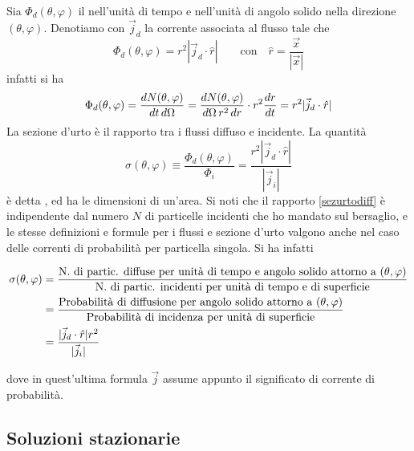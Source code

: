\documentclass[../../FisicaTeorica.tex]{subfiles}
\begin{document}
Sia $\Phi_d (\theta, \varphi)$ il 
nell'unit{\`a} di tempo e nell'unit{\`a} di angolo solido nella direzione
$(\theta, \varphi)$. Denotiamo con $\vec{j}_d$ la corrente associata al flusso
tale che
\[ \Phi_d (\theta, \varphi) = r^2  | \vec{j}_d \cdot \hat{r} | \qquad
   \text{con} \quad \hat{r} = \frac{\vec{x}}{| \vec{x} |} \]
infatti si ha
\[ \Phi_d (\theta, \varphi) = \frac{d N (\theta, \varphi)}{d t \hspace{0.17em}
   d \Omega} = \frac{d N (\theta, \varphi)}{d \Omega \hspace{0.17em} r^2 
   \hspace{0.17em} d r} \cdot r^2  \frac{d r}{d t} = r^2  | \vec{j}_d \cdot
   \hat{r} | \]
La sezione d'urto {\`e} il rapporto tra i flussi diffuso e incidente. La
quantit{\`a}
\begin{equation}
\label{sezurtodiff} \sigma (\theta, \varphi) \equiv \frac{\Phi_d (\theta,
   \varphi)}{\Phi_i} = \frac{r^2  | \vec{j}_d \cdot \hat{r} |}{| \vec{j}_i |}
\end{equation}
{\`e} detta {}, ed ha le dimensioni di
un'area. Si noti che  il rapporto \eqref{sezurtodiff} {\`e} indipendente dal numero $N$ di
particelle incidenti che ho mandato sul bersaglio, e le stesse definizioni e
formule per i flussi e sezione d'urto valgono anche nel caso delle correnti di
probabilit{\`a} per particella singola. Si ha infatti

\begin{align}
  \sigma (\theta, \varphi) & = \frac{\text{N. di partic. diffuse per unit{\`a}
  di tempo e angolo solido attorno a } (\theta, \varphi)}{\text{N. di partic.
  incidenti per unit{\`a} di tempo e di superficie}} \notag \\
  & = \frac{\text{Probabilit{\`a} di diffusione per angolo solido attorno a }
  (\theta, \varphi)}{\text{Probabilit{\`a} di incidenza per unit{\`a} di
  superficie}} \notag\\
  & = \frac{| \vec{j}_d \cdot \hat{r} | r^2}{| \vec{j}_i |} \label{sezurtodiff2}
\end{align}

dove in quest'ultima formula $\vec{j}$ assume appunto il significato di
corrente di probabilit{\`a}.

\subsection{Soluzioni stazionarie}
\end{document}
